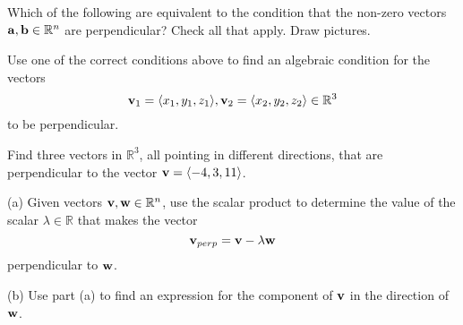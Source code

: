 \documentclass{ximera}
\begin{document}
\begin{question}  \label{Q235r74:Scalar}
Which of the following are equivalent to the condition that the non-zero vectors ${\bf a}, {\bf b} \in \mathbb{R}^n$ are perpendicular? Check all that apply. Draw pictures.

\begin{selectAll}  
  \end{selectAll}  
 \end{question}


\begin{question}   \label{Q32erdf:Scalar}
Use one of the correct conditions above to find an algebraic condition for the vectors 
\[
    {\bf v}_1= \langle x_1, y_1, z_1 \rangle, {\bf v}_2 = \langle  x_2, y_2, z_2\rangle \in \mathbb{R}^3 
\]
to be perpendicular.
\end{question}

\begin{question}  \label{Qgsdfbe34:Scalar}
Find three vectors in $\mathbb{R}^3$, all pointing in different directions, that are perpendicular to the vector ${\bf v}= \langle -4,3,11\rangle$. 
\end{question}



\begin{question} \label{Qdf6:Scalar}
 
\begin{onlineOnly}
    \begin{center}
\end{center}
\end{onlineOnly}


\end{question}


\begin{question}   \label{Qrasd5r:Scalar}
(a) Given vectors ${\bf v}, {\bf w} \in \mathbb{R}^n$, use the scalar product to determine the value of the scalar $\lambda\in \mathbb{R}$ that makes the vector
\[
     {\bf v}_{perp} = {\bf v} - \lambda {\bf w}
\]
perpendicular to ${\bf w}$.

(b) Use part (a) to find an expression for the component of ${\bf v}$ in the direction of ${\bf w}$.
\end{question}
\end{document}
